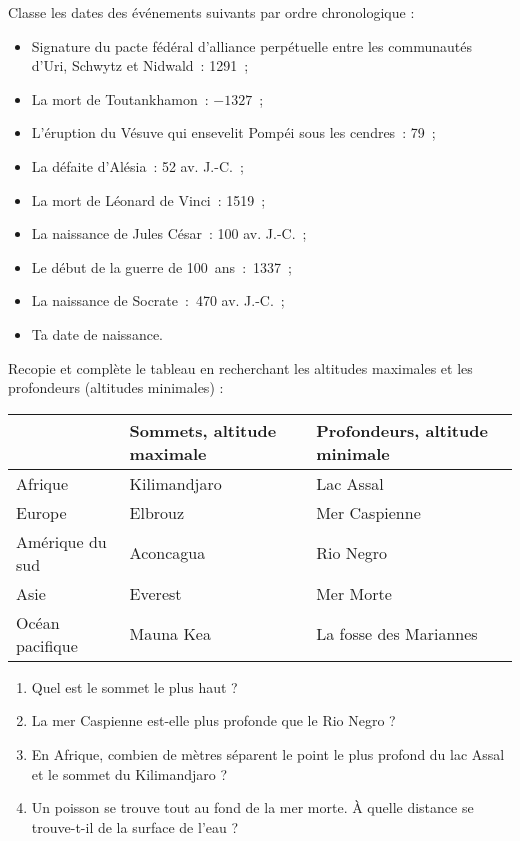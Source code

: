 \begin{exercice}[Histoire]
Classe les dates des événements suivants par ordre chronologique :
\begin{itemize}
 \item Signature du pacte fédéral d'alliance perpétuelle entre les communautés d'Uri, Schwytz et Nidwald : 1291 ;
 \item La mort de Toutankhamon : $- 1327$ ;
 \item L'éruption du Vésuve qui ensevelit Pompéi sous les cendres : 79 ;
 \item La défaite d'Alésia : 52 av. J.-C. ;
 \item La mort de Léonard de Vinci : 1519 ;
 \item La naissance de Jules César : 100 av. J.-C. ;
 \item Le début de la guerre de 100 ans : 1337 ;
 \item La naissance de Socrate : 470 av. J.-C. ;
 \item Ta date de naissance.
 \end{itemize}
\end{exercice}


\begin{exercice}[Géographie]
Recopie et complète le tableau en recherchant les altitudes maximales et les profondeurs (altitudes minimales) :\\[0.5em]
\begin{tabularx}{\linewidth}{|X|X|X|}
 \hline
 & Sommets, altitude maximale & Profondeurs, altitude minimale \\\hline
 Afrique & Kilimandjaro & Lac Assal \\\hline
 Europe & Elbrouz & Mer Caspienne \\\hline
 Amérique du sud & Aconcagua & Rio Negro \\\hline
 Asie & Everest & Mer Morte \\\hline
 Océan pacifique & Mauna Kea & La fosse des Mariannes \\\hline
 \end{tabularx}
  \vspace{0.3cm}
\begin{enumerate}
 \item Quel est le sommet le plus haut ?
 \item La mer Caspienne est-elle plus profonde que le Rio Negro ?
 \item En Afrique, combien de mètres séparent le point le plus profond du lac Assal et le sommet du Kilimandjaro ?
 \item Un poisson se trouve tout au fond de la mer morte. À quelle distance se trouve-t-il de la surface de l’eau ?
 \end{enumerate}
\end{exercice}


